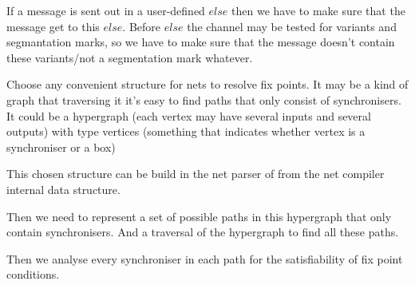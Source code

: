 If a message is sent out in a user-defined $else$ then we have to make sure that the message get to this $else$. Before $else$ the channel may be tested for variants and segmantation marks, so we have to make sure that the message doesn't contain these variants/not a segmentation mark whatever.


Choose any convenient structure for nets to resolve fix points. It may be a kind of graph that traversing it it's easy to find paths that only consist of synchronisers.
It could be a hypergraph (each vertex may have several inputs and several outputs) with type vertices (something that indicates whether vertex is a synchroniser or a box)

This chosen structure can be build in the net parser of from the net compiler internal data structure.

Then we need to represent a set of possible paths in this hypergraph that only contain synchronisers. And a traversal of the hypergraph to find all these paths.

Then we analyse every synchroniser in each path for the satisfiability of fix point conditions.
